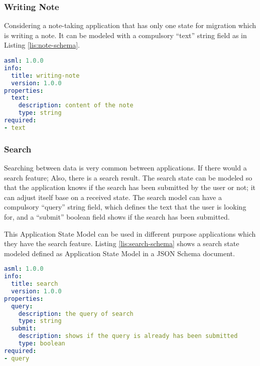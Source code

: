 \subsubsection{Writing Note}
Considering a note-taking application that has only one state for migration which is writing a note. It can be modeled with a compulsory “text” string field as in Listing \ref{lis:note-schema}.

\lstset{
  label=lis:note-schema, caption=Note Writing example Application State Model as JSON Schema in YAML.
}
\begin{lstlisting}[language=yaml]
asml: 1.0.0
info:
  title: writing-note
  version: 1.0.0
properties:
  text:
    description: content of the note
    type: string
required:
- text

\end{lstlisting}
\subsubsection{Search}
Searching between data is very common between applications. If there would a search feature; Also, there is a search result. The search state can be modeled so that the application knows if the search has been submitted by the user or not; it can adjust itself base on a received state. The search model can have a compulsory “query” string field, which defines the text that the user is looking for, and a “submit” boolean field shows if the search has been submitted.

This Application State Model can be used in different purpose applications which they have the search feature. Listing \ref{lis:search-schema} shows a search state modeled defined as Application State Model in a JSON Schema document.

\lstset{
  label=lis:search-schema, caption=Search example Application State Model as JSON Schema in YAML.
}
\begin{lstlisting}[language=yaml]
asml: 1.0.0
info:
  title: search
  version: 1.0.0
properties:
  query:
    description: the query of search
    type: string
  submit:
    description: shows if the query is already has been submitted
    type: boolean
required:
- query
\end{lstlisting}